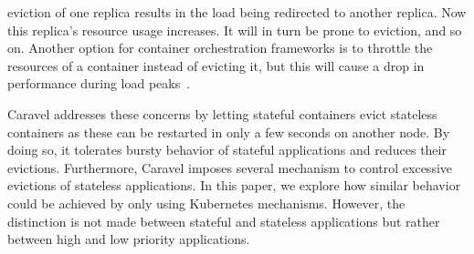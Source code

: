 eviction of one replica results in the load being redirected to another replica. Now this replica's resource usage increases. It will in turn be prone to eviction, and so on. Another option for container orchestration frameworks is to throttle the resources of a container instead of evicting it, but this will cause a drop in performance during load peaks~\citep{caravel}.

Caravel addresses these concerns by letting stateful containers evict stateless containers as these can be restarted in only a few seconds on another node. 
By doing so, it tolerates bursty behavior of stateful applications and reduces their evictions. Furthermore, Caravel imposes several mechanism to control excessive evictions of stateless applications. In this paper, we explore how similar behavior could be achieved by only using Kubernetes mechanisms. However, the distinction is not made between stateful and stateless applications but rather between high and low priority applications. 

